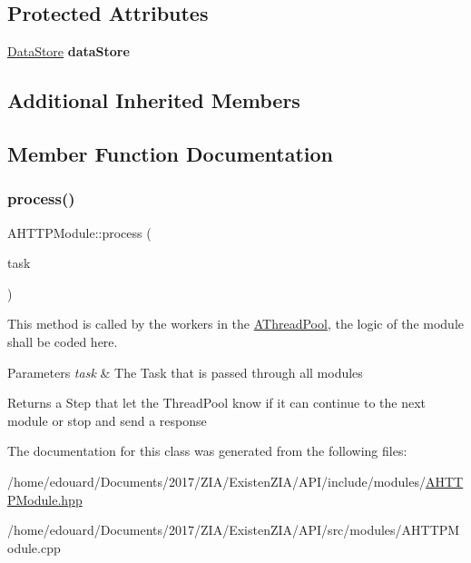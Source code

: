 \subsection*{Protected Attributes}
\begin{DoxyCompactItemize}
\item 
\mbox{\label{classxzia_1_1AHTTPModule_a39a53de846e4e012adacfebfdaf2c4db}} 
\mbox{\hyperlink{classxzia_1_1DataStore}{Data\+Store}} {\bfseries data\+Store}
\end{DoxyCompactItemize}
\subsection*{Additional Inherited Members}


\subsection{Member Function Documentation}
\mbox{\label{classxzia_1_1AHTTPModule_aec792240cda0e3697184e6271fb3a66b}} 
\subsubsection{\texorpdfstring{process()}{process()}}
{\footnotesize\ttfamily A\+H\+T\+T\+P\+Module\+::process (\begin{DoxyParamCaption}\item[{\mbox{\hyperlink{classxzia_1_1ATask}{A\+Task}} \&}]{task }\end{DoxyParamCaption})\hspace{0.3cm}{\ttfamily [pure virtual]}}



This method is called by the workers in the \mbox{\hyperlink{classxzia_1_1AThreadPool}{A\+Thread\+Pool}}, the logic of the module shall be coded here. 


\begin{DoxyParams}{Parameters}
{\em task} & The Task that is passed through all modules \\
\hline
\end{DoxyParams}
\begin{DoxyReturn}{Returns}
a Step that let the Thread\+Pool know if it can continue to the next module or stop and send a response 
\end{DoxyReturn}


The documentation for this class was generated from the following files\+:\begin{DoxyCompactItemize}
\item 
/home/edouard/\+Documents/2017/\+Z\+I\+A/\+Existen\+Z\+I\+A/\+A\+P\+I/include/modules/\mbox{\hyperlink{AHTTPModule_8hpp}{A\+H\+T\+T\+P\+Module.\+hpp}}\item 
/home/edouard/\+Documents/2017/\+Z\+I\+A/\+Existen\+Z\+I\+A/\+A\+P\+I/src/modules/A\+H\+T\+T\+P\+Module.\+cpp\end{DoxyCompactItemize}

